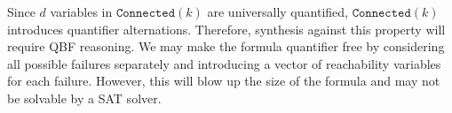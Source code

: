 Since $d$ variables in $\texttt{Connected}(k)$ are universally
quantified, $\texttt{Connected}(k)$ introduces quantifier alternations.
%
Therefore, synthesis against this property will require QBF reasoning.
%
We may make the formula quantifier free  by considering all possible failures
separately and introducing a vector of reachability variables for each
failure.
%
However, this will blow up the size of the formula and may not be
solvable by a SAT solver.
%



